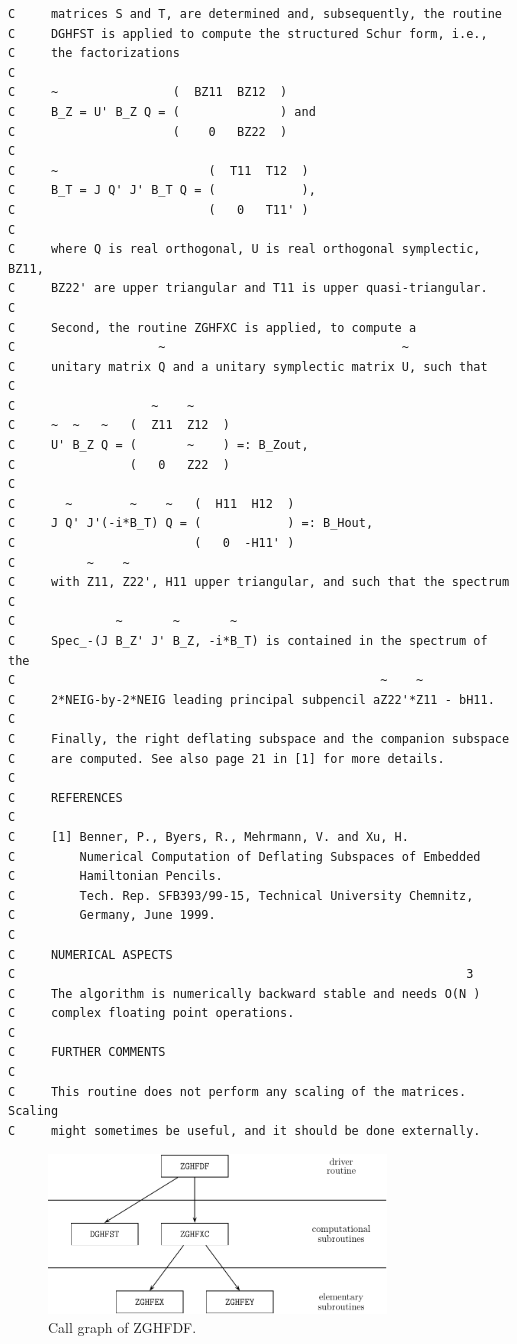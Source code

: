 \documentclass[a4paper,10pt]{article}
\begin{document}
\begin{verbatim}
C     matrices S and T, are determined and, subsequently, the routine
C     DGHFST is applied to compute the structured Schur form, i.e.,
C     the factorizations
C
C     ~                (  BZ11  BZ12  )
C     B_Z = U' B_Z Q = (              ) and
C                      (    0   BZ22  )
C
C     ~                     (  T11  T12  )
C     B_T = J Q' J' B_T Q = (            ),
C                           (   0   T11' )
C
C     where Q is real orthogonal, U is real orthogonal symplectic, BZ11,
C     BZ22' are upper triangular and T11 is upper quasi-triangular.
C
C     Second, the routine ZGHFXC is applied, to compute a
C                    ~                                 ~
C     unitary matrix Q and a unitary symplectic matrix U, such that
C
C                   ~    ~
C     ~  ~   ~   (  Z11  Z12  )
C     U' B_Z Q = (       ~    ) =: B_Zout,
C                (   0   Z22  )
C
C       ~        ~    ~   (  H11  H12  )
C     J Q' J'(-i*B_T) Q = (            ) =: B_Hout,
C                         (   0  -H11' )
C          ~    ~   
C     with Z11, Z22', H11 upper triangular, and such that the spectrum
C
C              ~       ~       ~
C     Spec_-(J B_Z' J' B_Z, -i*B_T) is contained in the spectrum of the
C                                                   ~    ~
C     2*NEIG-by-2*NEIG leading principal subpencil aZ22'*Z11 - bH11.
C
C     Finally, the right deflating subspace and the companion subspace
C     are computed. See also page 21 in [1] for more details.
C
C     REFERENCES
C
C     [1] Benner, P., Byers, R., Mehrmann, V. and Xu, H.
C         Numerical Computation of Deflating Subspaces of Embedded
C         Hamiltonian Pencils.
C         Tech. Rep. SFB393/99-15, Technical University Chemnitz,
C         Germany, June 1999.
C
C     NUMERICAL ASPECTS
C                                                               3
C     The algorithm is numerically backward stable and needs O(N )
C     complex floating point operations.
C
C     FURTHER COMMENTS
C
C     This routine does not perform any scaling of the matrices. Scaling
C     might sometimes be useful, and it should be done externally.
\end{verbatim}
%
\begin{figure}[ht]
 \centering
 \includegraphics[width=0.8\textwidth]{complex_factored.pdf}
 \caption{Call graph of ZGHFDF.}
\end{figure}
%
\end{document}
